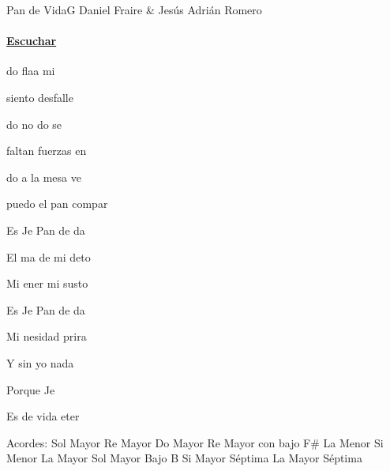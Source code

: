 \documentclass[12pt, spanish]{book}
\begin{document}
    \begin{song}{Pan de Vida}{G}
    {} %
    {Daniel Fraire \& Jesús Adrián Romero}
    {} %
    {}
        \ifChordBk
        \paragraph{\mbox{}\hfill\protect\href{https://open.spotify.com/intl-es/track/5Y5LY9fy1kFwl71QHw4UEe}{Escuchar}\mbox{}\hfill}
        \fi



        \begin{SBOpGroup}
            do flaa mi 

             siento desfalle

            do no do se

             faltan fuerzas en 

            do a la mesa ve

             puedo el pan compar
        \end{SBOpGroup}

        \begin{SBChorus}
            Es Je  Pan de da

            El ma de mi deto

            Mi ener mi susto

            Es Je  Pan de da

            Mi nesidad prira

            Y sin  yo nada 

            Porque Je

            Es  de vida eter
        \end{SBChorus}

        \ifChordBk
        \begin{SBOpGroup}
            Acordes:\break
            \upchord{\G}\qquad Sol Mayor \hfill
            \upchord{\D}\qquad Re Mayor \hfill\null\break
            \upchord{\C}\qquad Do Mayor \hfill
            \upchord{\DFs}\qquad Re Mayor con bajo F\# \hfill\null\break
            \upchord{\Am}\qquad La Menor \hfill
            \upchord{\Bm}\qquad Si Menor \hfill\null\break
            \upchord{\A}\qquad La Mayor \hfill
            \upchord{\GB}\qquad Sol Mayor Bajo B \hfill\qquad\qquad\qquad\break
            \upchord{\Bseven}\qquad\qquad Si Mayor S\'eptima \hfill
            \upchord{\Aseven}\qquad La Mayor S\'eptima \hfill\null\break
        \end{SBOpGroup}
        \fi
    \end{song}
\end{document}

